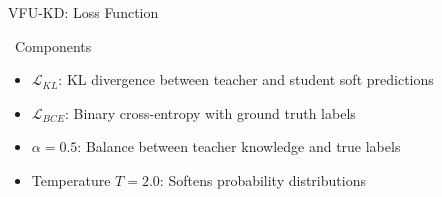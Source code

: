 \documentclass[aspectratio=169, 11pt]{beamer}
\begin{document}
\begin{frame}{VFU-KD: Loss Function}
    \begin{center}
    \end{center}
    
    \vspace{0.5em}
    \begin{block}{\faInfoCircle\ Components}
        \begin{itemize}
            \item $\mathcal{L}_{KL}$: KL divergence between teacher and student soft predictions
            \item $\mathcal{L}_{BCE}$: Binary cross-entropy with ground truth labels
            \item $\alpha = 0.5$: Balance between teacher knowledge and true labels
            \item Temperature $T = 2.0$: Softens probability distributions
        \end{itemize}
    \end{block}
\end{frame}
\end{document}
